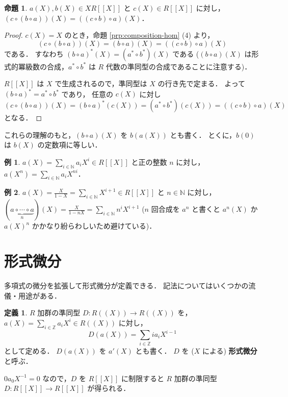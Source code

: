 \documentclass{jsarticle}
\newcommand{\N}{\mathbb{N}}
\newcommand{\Z}{\mathbb{Z}}
\newcommand{\longto}{\longrightarrow}
\theoremstyle{definition}
\newtheorem*{Dfn}{定義}
\newtheorem*{Exm}{例}
\newtheorem{Prp}{命題}
\newenvironment{dfn}{\vspace{1ex}\begin{screen}\begin{Dfn}}{\end{Dfn}\end{screen}\vspace{1ex}}
\newenvironment{exm}{\begin{leftbar}\begin{Exm}}{\end{Exm}\end{leftbar}}
\newenvironment{prp}{\vspace{1ex}\begin{screen}\begin{Prp}}{\end{Prp}\end{screen}}
\newenvironment{prf}{\begin{leftbar}\begin{proof}}{\end{proof}\end{leftbar}}
\begin{document}
\begin{prp}
  $a(X), b(X) \in X R[[X]]$ と $c(X) \in R[[X]]$ に対し，
  $(c \circ (b \circ a))(X) = ((c \circ b) \circ a)(X)$．
\end{prp}
\begin{prf}
  $c(X) = X$ のとき，命題 \ref{prp:composition-hom} (4) より，
  \[
    (c \circ (b \circ a))(X) = (b \circ a)(X) = ((c \circ b) \circ a)(X)
  \]
  である．
  すなわち $(b \circ a)^*(X) = (a^* \circ b^*)(X)$ である ($(b \circ a)(X)$ は形式的冪級数の合成，$a^* \circ b^*$ は $R$ 代数の準同型の合成であることに注意する)．

  $R[[X]]$ は $X$ で生成されるので，準同型は $X$ の行き先で定まる．
  よって $(b \circ a)^* = a^* \circ b^*$ であり，
  任意の $c(X)$ に対し
  \[
    (c \circ (b \circ a))(X) = (b \circ a)^*(c(X)) = (a^* \circ b^*)(c(X)) = ((c \circ b) \circ a)(X)
  \]
  となる．
\end{prf}

これらの理解のもと，$(b \circ a)(X)$ を $b(a(X))$ とも書く．
とくに，$b(0)$ は $b(X)$ の定数項に等しい．

\begin{exm}
  $a(X) = \sum_{i\in\N} a_i X^i \in R[[X]]$ と正の整数 $n$ に対し，
  $a(X^n) = \sum_{i\in\N} a_i X^{ni}$．
\end{exm}

\begin{exm}
  $a(X) = \frac{X}{1 - X} = \sum_{i\in\N} X^{i+1} \in R[[X]]$ と $n \in \N$ に対し，
  $(\underbrace{a \circ \cdots \circ a}_{n})(X) = \frac{X}{1 - n X} = \sum_{i\in\N} n^i X^{i+1}$
  ($n$ 回合成を $a^n$ と書くと $a^n(X)$ か $a(X)^n$ かかなり紛らわしいため避けている)．
\end{exm}


\section{形式微分}
多項式の微分を拡張して形式微分が定義できる．
記法についてはいくつかの流儀・用途がある．

\begin{dfn}
  $R$ 加群の準同型 $D\colon R((X)) \longto R((X))$ を，
  $a(X) = \sum_{i\in\Z} a_i X^i \in R((X))$ に対し，
  \[
    D(a(X)) = \sum_{i\in\Z} i a_i X^{i-1}
  \]
  として定める．
  $D(a(X))$ を $a'(X)$ とも書く．
  $D$ を ($X$ による) \textbf{形式微分}と呼ぶ．
\end{dfn}

$0 a_0 X^{-1} = 0$ なので，$D$ を $R[[X]]$ に制限すると
$R$ 加群の準同型 $D\colon R[[X]] \longto R[[X]]$ が得られる．
\end{document}
